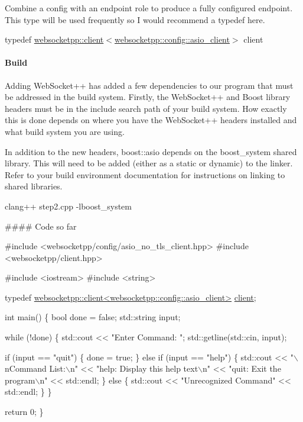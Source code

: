 Combine a config with an endpoint role to produce a fully configured endpoint. This type will be used frequently so I would recommend a typedef here.

{\ttfamily typedef \mbox{\hyperlink{classwebsocketpp_1_1client}{websocketpp\+::client}}$<$\mbox{\hyperlink{structwebsocketpp_1_1config_1_1asio__client}{websocketpp\+::config\+::asio\+\_\+client}}$>$ client}

\paragraph*{Build}

Adding Web\+Socket++ has added a few dependencies to our program that must be addressed in the build system. Firstly, the Web\+Socket++ and Boost library headers must be in the include search path of your build system. How exactly this is done depends on where you have the Web\+Socket++ headers installed and what build system you are using.

In addition to the new headers, boost\+::asio depends on the {\ttfamily boost\+\_\+system} shared library. This will need to be added (either as a static or dynamic) to the linker. Refer to your build environment documentation for instructions on linking to shared libraries.

{\ttfamily clang++ step2.\+cpp -\/lboost\+\_\+system}

\#\#\#\# Code so far 
\begin{DoxyCode}
\textcolor{preprocessor}{#include <websocketpp/config/asio\_no\_tls\_client.hpp>}
\textcolor{preprocessor}{#include <websocketpp/client.hpp>}

\textcolor{preprocessor}{#include <iostream>}
\textcolor{preprocessor}{#include <string>}

\textcolor{keyword}{typedef} \mbox{\hyperlink{classwebsocketpp_1_1client}{websocketpp::client<websocketpp::config::asio\_client>}}
       \mbox{\hyperlink{classwebsocketpp_1_1client}{client}};

\textcolor{keywordtype}{int} main() \{
    \textcolor{keywordtype}{bool} done = \textcolor{keyword}{false};
    std::string input;

    \textcolor{keywordflow}{while} (!done) \{
        std::cout << \textcolor{stringliteral}{"Enter Command: "};
        std::getline(std::cin, input);

        \textcolor{keywordflow}{if} (input == \textcolor{stringliteral}{"quit"}) \{
            done = \textcolor{keyword}{true};
        \} \textcolor{keywordflow}{else} \textcolor{keywordflow}{if} (input == \textcolor{stringliteral}{"help"}) \{
            std::cout
                << \textcolor{stringliteral}{"\(\backslash\)nCommand List:\(\backslash\)n"}
                << \textcolor{stringliteral}{"help: Display this help text\(\backslash\)n"}
                << \textcolor{stringliteral}{"quit: Exit the program\(\backslash\)n"}
                << std::endl;
        \} \textcolor{keywordflow}{else} \{
            std::cout << \textcolor{stringliteral}{"Unrecognized Command"} << std::endl;
        \}
    \}

    \textcolor{keywordflow}{return} 0;
\}
\end{DoxyCode}


